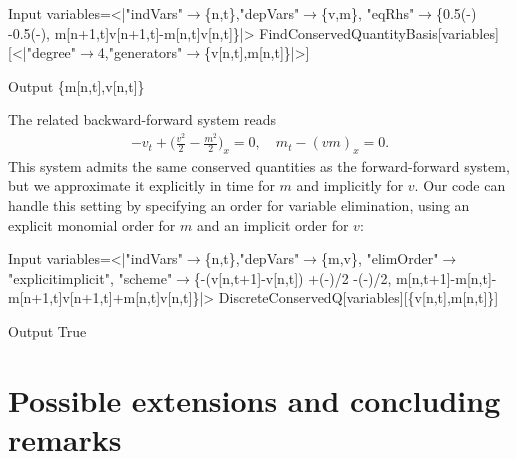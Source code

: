 \documentclass[runningheads]{llncs}
\newcommand{\1}{\chi}
\begin{document}
\begin{example}
	\begin{small}
		\begin{mmaCell}[moredefined={variables, PartialDVarD, FindConservedQuantityBasis}]{Input}
  variables=<|"indVars"\(\pmb{\to}\)\{n,t\},"depVars"\(\pmb{\to}\)\{v,m\},
  "eqRhs"\(\pmb{\to}\)\{0.5(-)
  -0.5(-),
  m[n+1,t]v[n+1,t]-m[n,t]v[n,t]\}|>
  FindConservedQuantityBasis[variables]
  [<|"degree"\(\pmb{\to}\)4,"generators"\(\pmb{\to}\)\{v[n,t],m[n,t]\}|>]
  
\end{mmaCell}
		\begin{mmaCell}{Output}
  \{m[n,t],v[n,t]\}
\end{mmaCell}
	\end{small}
\end{example}
\begin{example}
	The related backward-forward system reads
	\begin{gather*}
		-v_t+\Big(\frac{v^2}{2}-\frac{m^2}{2}\Big)_x=0,\quad
		m_t-(vm)_x=0.
	\end{gather*}
	This system admits the same conserved quantities as the forward-forward system, but we approximate it explicitly in time for $m$ and implicitly for $v$.
	Our code can handle this setting by specifying an order for variable elimination, using an explicit monomial order for $m$ and an implicit order for $v$:
	
	\begin{small}
		\begin{mmaCell}[moredefined={variables, DiscreteConservedQ}]{Input}
  variables=<|"indVars"\(\pmb{\to}\)\{n,t\},"depVars"\(\pmb{\to}\)\{m,v\},
  "elimOrder"\(\pmb{\to}\)"explicitimplicit",
  "scheme"\(\pmb{\to}\)\{-(v[n,t+1]-v[n,t])
  +(-)/2
  -(-)/2,
  m[n,t+1]-m[n,t]-m[n+1,t]v[n+1,t]+m[n,t]v[n,t]\}|>
  DiscreteConservedQ[variables][\{v[n,t],m[n,t]\}]
  
\end{mmaCell}
		\begin{mmaCell}{Output}
  True
\end{mmaCell}
	\end{small}
\end{example}
\section{Possible extensions and concluding remarks}
\end{document}
